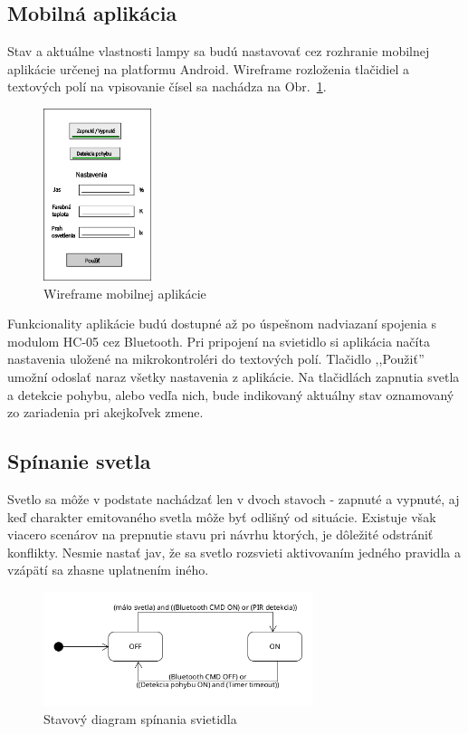 \documentclass[12pt, a4paper]{article}
\begin{document}
\subsection{Mobilná aplikácia}
Stav a aktuálne vlastnosti lampy sa budú nastavovať cez rozhranie mobilnej aplikácie určenej na platformu Android. Wireframe rozloženia tlačidiel a textových polí na vpisovanie čísel sa nachádza na Obr.~\ref{fig:app-wireframe}.
\begin{figure}[h]
	\centering
	\includegraphics[width=0.28\textwidth]{assets/wireframe.png}
	\caption{Wireframe mobilnej aplikácie}
	\label{fig:app-wireframe}
\end{figure}

Funkcionality aplikácie budú dostupné až po úspešnom nadviazaní spojenia s modulom HC-05 cez Bluetooth. Pri pripojení na svietidlo si aplikácia načíta nastavenia uložené na mikrokontroléri do textových polí. Tlačidlo ,,Použiť'' umožní odoslať naraz všetky nastavenia z aplikácie. Na tlačidlách zapnutia svetla a detekcie pohybu, alebo vedľa nich, bude indikovaný aktuálny stav oznamovaný zo zariadenia pri akejkoľvek zmene.

\subsection{Spínanie svetla}
Svetlo sa môže v podstate nachádzať len v dvoch stavoch - zapnuté a vypnuté, aj keď charakter emitovaného svetla môže byť odlišný od situácie. Existuje však viacero scenárov na prepnutie stavu pri návrhu ktorých, je dôležité odstrániť konflikty. Nesmie nastať jav, že sa svetlo rozsvieti aktivovaním jedného pravidla a vzápätí sa zhasne uplatnením iného.
\begin{figure}[h]
   \centering
	\includegraphics[width=0.7\textwidth]{assets/light-states.png}
	\caption{Stavový diagram spínania svietidla}
	\label{fig:state-diagram-switch}
\end{figure}
\end{document}
